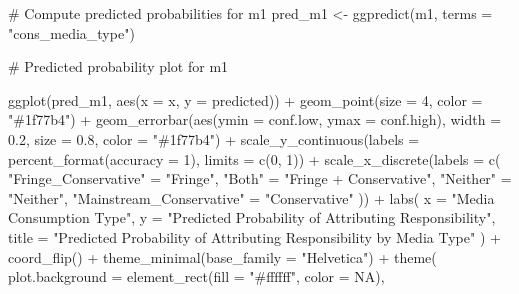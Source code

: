 \documentclass[
  letterpaper,
  DIV=11,
  numbers=noendperiod]{scrartcl}
\newenvironment{Shaded}{\begin{snugshade}}{\end{snugshade}}
\newcommand{\AttributeTok}[1]{\textcolor[rgb]{0.40,0.45,0.13}{#1}}
\newcommand{\CommentTok}[1]{\textcolor[rgb]{0.37,0.37,0.37}{#1}}
\newcommand{\ConstantTok}[1]{\textcolor[rgb]{0.56,0.35,0.01}{#1}}
\newcommand{\DecValTok}[1]{\textcolor[rgb]{0.68,0.00,0.00}{#1}}
\newcommand{\FloatTok}[1]{\textcolor[rgb]{0.68,0.00,0.00}{#1}}
\newcommand{\FunctionTok}[1]{\textcolor[rgb]{0.28,0.35,0.67}{#1}}
\newcommand{\NormalTok}[1]{\textcolor[rgb]{0.00,0.23,0.31}{#1}}
\newcommand{\OtherTok}[1]{\textcolor[rgb]{0.00,0.23,0.31}{#1}}
\newcommand{\SpecialCharTok}[1]{\textcolor[rgb]{0.37,0.37,0.37}{#1}}
\newcommand{\StringTok}[1]{\textcolor[rgb]{0.13,0.47,0.30}{#1}}
\begin{document}
\begin{Shaded}
\begin{Highlighting}[]
\CommentTok{\# Compute predicted probabilities for m1}
\NormalTok{pred\_m1 }\OtherTok{\textless{}{-}} \FunctionTok{ggpredict}\NormalTok{(m1, }\AttributeTok{terms =} \StringTok{"cons\_media\_type"}\NormalTok{)}

\CommentTok{\# Predicted probability plot for m1}

\FunctionTok{ggplot}\NormalTok{(pred\_m1, }\FunctionTok{aes}\NormalTok{(}\AttributeTok{x =}\NormalTok{ x, }\AttributeTok{y =}\NormalTok{ predicted)) }\SpecialCharTok{+}
\FunctionTok{geom\_point}\NormalTok{(}\AttributeTok{size =} \DecValTok{4}\NormalTok{, }\AttributeTok{color =} \StringTok{"\#1f77b4"}\NormalTok{) }\SpecialCharTok{+}
\FunctionTok{geom\_errorbar}\NormalTok{(}\FunctionTok{aes}\NormalTok{(}\AttributeTok{ymin =}\NormalTok{ conf.low, }\AttributeTok{ymax =}\NormalTok{ conf.high), }\AttributeTok{width =} \FloatTok{0.2}\NormalTok{, }\AttributeTok{size =} \FloatTok{0.8}\NormalTok{, }\AttributeTok{color =} \StringTok{"\#1f77b4"}\NormalTok{) }\SpecialCharTok{+}
\FunctionTok{scale\_y\_continuous}\NormalTok{(}\AttributeTok{labels =} \FunctionTok{percent\_format}\NormalTok{(}\AttributeTok{accuracy =} \DecValTok{1}\NormalTok{), }\AttributeTok{limits =} \FunctionTok{c}\NormalTok{(}\DecValTok{0}\NormalTok{, }\DecValTok{1}\NormalTok{)) }\SpecialCharTok{+}
\FunctionTok{scale\_x\_discrete}\NormalTok{(}\AttributeTok{labels =} \FunctionTok{c}\NormalTok{(}
\StringTok{"Fringe\_Conservative"} \OtherTok{=} \StringTok{"Fringe"}\NormalTok{,}
\StringTok{"Both"} \OtherTok{=} \StringTok{"Fringe + Conservative"}\NormalTok{,}
\StringTok{"Neither"} \OtherTok{=} \StringTok{"Neither"}\NormalTok{,}
\StringTok{"Mainstream\_Conservative"} \OtherTok{=} \StringTok{"Conservative"}
\NormalTok{)) }\SpecialCharTok{+}
\FunctionTok{labs}\NormalTok{(}
\AttributeTok{x =} \StringTok{"Media Consumption Type"}\NormalTok{,}
\AttributeTok{y =} \StringTok{"Predicted Probability of Attributing Responsibility"}\NormalTok{,}
\AttributeTok{title =} \StringTok{"Predicted Probability of Attributing Responsibility by Media Type"}
\NormalTok{) }\SpecialCharTok{+}
\FunctionTok{coord\_flip}\NormalTok{() }\SpecialCharTok{+}
\FunctionTok{theme\_minimal}\NormalTok{(}\AttributeTok{base\_family =} \StringTok{"Helvetica"}\NormalTok{) }\SpecialCharTok{+}
\FunctionTok{theme}\NormalTok{(}
\AttributeTok{plot.background =} \FunctionTok{element\_rect}\NormalTok{(}\AttributeTok{fill =} \StringTok{"\#ffffff"}\NormalTok{, }\AttributeTok{color =} \ConstantTok{NA}\NormalTok{),}

\end{Highlighting}
\end{Shaded}
\end{document}
